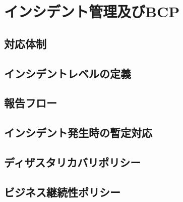\chapter{インシデント管理及びBCP}
\section{対応体制}
\section{インシデントレベルの定義}
\section{報告フロー}
\section{インシデント発生時の暫定対応}
\section{ディザスタリカバリポリシー}
\section{ビジネス継続性ポリシー}